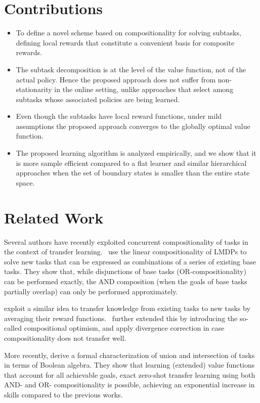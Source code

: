 \section{Contributions}
\begin{itemize}
\item To define a novel scheme based on compositionality for solving subtasks, defining local rewards that constitute a convenient basis for composite rewards.
\item The subtask decomposition is at the level of the value function, not of the actual policy. Hence the proposed approach does not suffer from non-stationarity in the online setting, unlike approaches that select among subtasks whose associated policies are being learned.
\item Even though the subtasks have local reward functions, under mild assumptions the proposed approach converges to the globally optimal value function.
\item The proposed learning algorithm is analyzed empirically, and we show that it is more sample efficient compared to a flat learner and similar hierarchical approaches when the set of boundary states is smaller than the entire state space.
\end{itemize}


\section{Related Work}
Several authors have recently exploited concurrent compositionality of tasks in the context of transfer learning.~\citet{Niekerk2019} use the linear compositionality of LMDPs to solve new tasks that can be expressed as combinations of a series of existing base tasks. They show that, while disjunctions of base tasks (OR-compositionality) can be performed exactly, the AND composition (when the goals of base tasks partially overlap) can only be performed approximately.

\citep{Haarnoja2018a} exploit a similar idea to transfer knowledge from existing tasks to new tasks by averaging their reward functions.~\citep{Hunt2019} further extended this by introducing the so-called compositional optimism, and apply divergence correction in case compositionality does not transfer well.

More recently, \citep{NangueTasse2020} derive a formal characterization of union and intersection of tasks in terms of Boolean algebra. They show that learning (extended) value functions that account for all achievable goals, exact zero-shot transfer learning using both AND- and OR- compositionality is possible, achieving an exponential increase in skills compared to the previous works.


